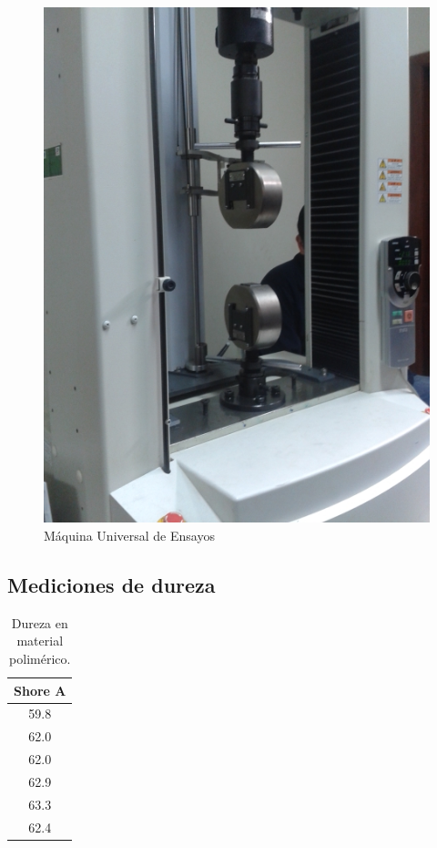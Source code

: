 \documentclass[a4paper, 11pt]{article}
\begin{document}
\begin{figure}[h!]
\begin{minipage}[t]{.45\textwidth}
\begin{center}
\includegraphics[scale=0.2]{maquina_universal_ensayos.png}
\caption{Máquina Universal de Ensayos}
\label{maquina_universal_ensayos}
\end{center}
\end{minipage}
\hfill
\end{figure}

\subsection{Mediciones de dureza}

\begin{table}[htbp]
\begin{center}
\begin{tabular}{|c|}
\hline
Shore A \\
\hline 
59.8 \\ \hline
62.0  \\ \hline
62.0 \\ \hline
62.9 \\ \hline
63.3 \\ \hline
62.4 \\ \hline
\end{tabular}
\caption{Dureza en material polimérico.}
\label{tabla:sencilla}
\end{center}
\end{table}
\end{document}
